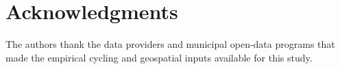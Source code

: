 \documentclass[preprint,authoryear,10pt]{elsarticle}
\begin{document}
\section*{Acknowledgments}
The authors thank the data providers and municipal open-data programs that made the empirical cycling and geospatial inputs available for this study.



\end{document}
